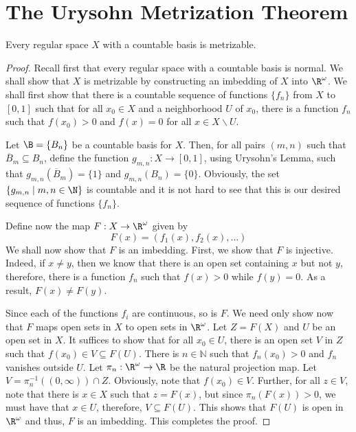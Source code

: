 \section{The Urysohn Metrization Theorem}
\begin{theorem}
    Every regular space $X$ with a countable basis is metrizable.
\end{theorem}
\begin{proof}
    Recall first that every regular space with a countable basis is normal.
    We shall show that $X$ is metrizable by constructing an imbedding of $X$ into $\R^\omega$. We shall first show that there is a countable sequence of functions $\{f_n\}$ from $X$ to $[0,1]$ such that for all $x_0\in X$ and a neighborhood $U$ of $x_0$, there is a function $f_n$ such that $f(x_0) > 0$ and $f(x)=0$ for all $x\in X\backslash U$.

    Let $\B = \{B_n\}$ be a countable basis for $X$. Then, for all pairs $(m, n)$ such that $\overline{B}_m\subseteq B_n$, define the function $g_{m,n}:X\to[0,1]$, using Urysohn's Lemma, such that $g_{m,n}(\overline{B}_m) = \{1\}$ and $g_{m,n}(B_n) = \{0\}$. Obviously, the set $\{g_{m,n}\mid m,n\in\N\}$ is countable and it is not hard to see that this is our desired sequence of functions $\{f_n\}$.

    Define now the map $F:X\to\R^\omega$ given by
    \begin{equation*}
        F(x) = (f_1(x),f_2(x),\ldots)
    \end{equation*}
    We shall now show that $F$ is an imbedding. First, we show that $F$ is injective. Indeed, if $x\ne y$, then we know that there is an open set containing $x$ but not $y$, therefore, there is a function $f_n$ such that $f(x) > 0$ while $f(y) = 0$. As a result, $F(x)\ne F(y)$.

    Since each of the functions $f_i$ are continuous, so is $F$. We need only show now that $F$ maps open sets in $X$ to open sets in $\R^\omega$. Let $Z = F(X)$ and $U$ be an open set in $X$. It suffices to show that for all $x_0\in U$, there is an open set $V$ in $Z$ such that $f(x_0)\in V\subseteq F(U)$. There is $n\in\mathbb{N}$ such that $f_n(x_0) > 0$ and $f_n$ vanishes outside $U$. Let $\pi_n: \R^\omega\to\R$ be the natural projection map. Let $V = \pi_n^{-1}((0,\infty))\cap Z$. Obviously, note that $f(x_0)\in V$. Further, for all $z\in V$, note that there is $x\in X$ such that $z = F(x)$, but since $\pi_n(F(x)) > 0$, we must have that $x\in U$, therefore, $V\subseteq F(U)$. This shows that $F(U)$ is open in $\R^\omega$ and thus, $F$ is an imbedding. This completes the proof.
\end{proof}

